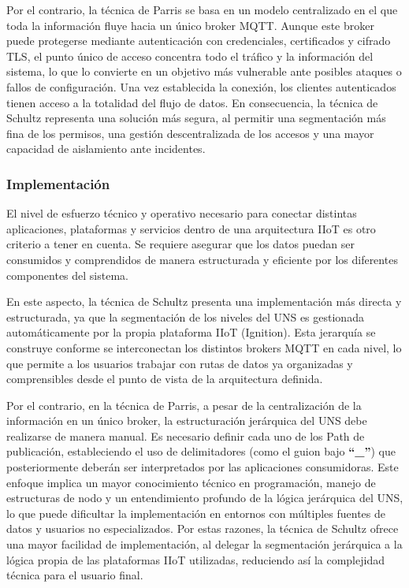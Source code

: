 Por el contrario, la técnica de Parris se basa en un modelo centralizado en el que toda la información fluye hacia un único broker MQTT. Aunque este broker puede protegerse mediante autenticación con credenciales, certificados y cifrado TLS, el punto único de acceso concentra todo el tráfico y la información del sistema, lo que lo convierte en un objetivo más vulnerable ante posibles ataques o fallos de configuración. Una vez establecida la conexión, los clientes autenticados tienen acceso a la totalidad del flujo de datos. En consecuencia, la técnica de Schultz representa una solución más segura, al permitir una segmentación más fina de los permisos, una gestión descentralizada de los accesos y una mayor capacidad de aislamiento ante incidentes.

\subsubsection{Implementación}
El nivel de esfuerzo técnico y operativo necesario para conectar distintas aplicaciones, plataformas y servicios dentro de una arquitectura IIoT es otro criterio a tener en cuenta. Se requiere asegurar que los datos puedan ser consumidos y comprendidos de manera estructurada y eficiente por los diferentes componentes del sistema.

En este aspecto, la técnica de Schultz presenta una implementación más directa y estructurada, ya que la segmentación de los niveles del UNS es gestionada automáticamente por la propia plataforma IIoT (Ignition). Esta jerarquía se construye conforme se interconectan los distintos brokers MQTT en cada nivel, lo que permite a los usuarios trabajar con rutas de datos ya organizadas y comprensibles desde el punto de vista de la arquitectura definida. 

Por el contrario, en la técnica de Parris, a pesar de la centralización de la información en un único broker, la estructuración jerárquica del UNS debe realizarse de manera manual. Es necesario definir cada uno de los Path de publicación, estableciendo el uso de delimitadores (como el guion bajo \textbf{“\_”}) que posteriormente deberán ser interpretados por las aplicaciones consumidoras. Este enfoque implica un mayor conocimiento técnico en programación, manejo de estructuras de nodo y un entendimiento profundo de la lógica jerárquica del UNS, lo que puede dificultar la implementación en entornos con múltiples fuentes de datos y usuarios no especializados. Por estas razones, la técnica de Schultz ofrece una mayor facilidad de implementación, al delegar la segmentación jerárquica a la lógica propia de las plataformas IIoT utilizadas, reduciendo así la complejidad técnica para el usuario final.

